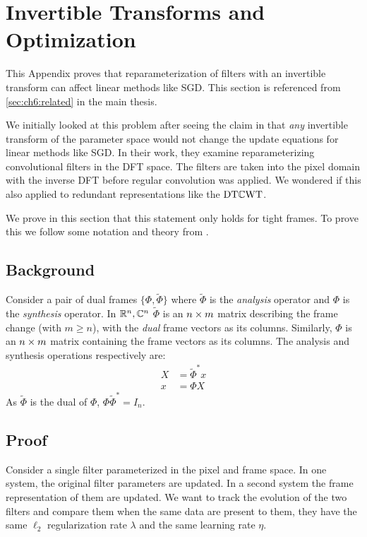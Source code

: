 \chapter{Invertible Transforms and Optimization} \label{appC:invertible}
\def \path {freqlearn/}
\def \imgpath {freqlearn/images}

This Appendix proves that reparameterization of filters with an invertible
transform can affect linear methods like SGD. This section is referenced from 
\autoref{sec:ch6:related} in the main thesis.

We initially looked at this problem after seeing the claim in
\cite{rippel_spectral_2015} that \emph{any} invertible transform of the parameter
space would not change the update equations for linear methods like SGD. In
their work, they examine reparameterizing convolutional filters in the DFT
space. The filters are taken into the pixel domain with the inverse DFT before
regular convolution was applied. We wondered if this also applied to redundant
representations like the $\DTCWT$.

We prove in this section that this statement only holds for tight frames.
To prove this we follow some notation and theory from 
\cite{kovacevic_introduction_2008}.

\section{Background}
Consider a pair of dual frames $\{\Phi, \tilde{\Phi}\}$ where $\tilde{\Phi}$ is
the \emph{analysis} operator and $\Phi$ is the \emph{synthesis} operator. 
In $\reals[n], \complexes[n]$ $\tilde{\Phi}$ is an $n\x m$ matrix describing the
frame change (with $m \geq n$), with the \emph{dual} frame vectors as its columns.
Similarly, $\Phi$ is an $n\x m$ matrix containing the frame vectors as its
columns. The analysis and synthesis operations respectively are:
\begin{align}
  X &= \tilde{\Phi}^* x \label{eq:appC:analysis}\\
  x &= \Phi X \label{eq:appC:synthesis}
\end{align}
As $\tilde{\Phi}$ is the dual of $\Phi$, $\Phi \tilde{\Phi}^* = I_n$.

\section{Proof}
Consider a single filter parameterized in the pixel and frame space. In one
system, the original filter parameters are updated. In a second system the
frame representation of them are updated. We want to track the evolution of the
two filters and compare them when the same data are present to them, they have
the same $\ell_2$ regularization rate $\lambda$ and the same learning rate $\eta$.

